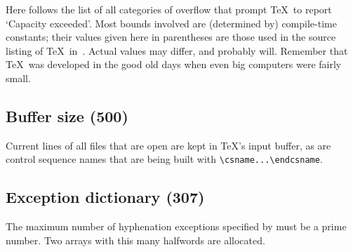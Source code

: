 \documentclass[twoside,letterpaper,openright]{rapport3}
\begin{document}
Here follows the list of all categories of overflow that
prompt \TeX\ to report `Capacity exceeded'.
Most bounds involved are (determined by) compile-time
constants; their values given here in parentheses are those
used in the source listing of \TeX\ in~\cite{Knuth:TeXbook}.
Actual values may differ, and probably will. Remember
that \TeX\ was developed in the good old days when even
big computers were fairly small.

\subsection{Buffer size {\rm(500)}}

Current lines of all files that are open are kept in
\TeX's input buffer, as are control sequence names
that are being built with \verb-\csname...\endcsname-.

\subsection{Exception dictionary {\rm(307)}}

The maximum number of hyphenation exceptions specified
by  must be a prime number.
Two arrays with this many halfwords are allocated.
\end{document}
